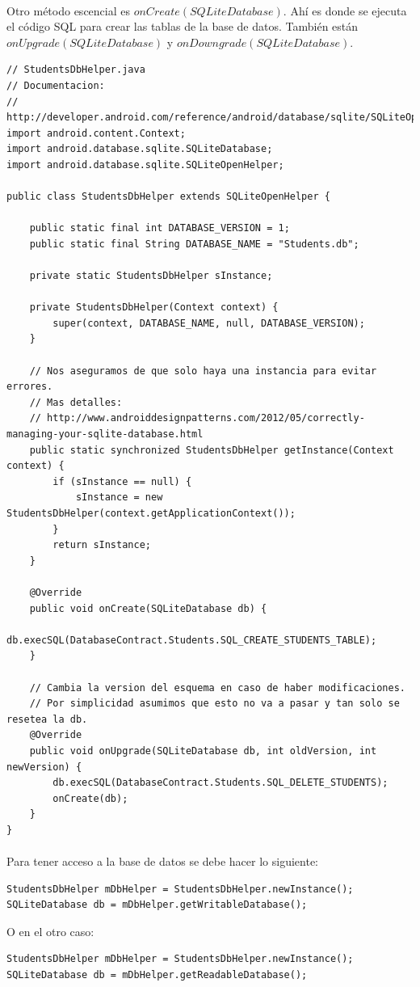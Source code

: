 \documentclass[10pt]{extarticle}
\begin{document}
\paragraph{}
Otro método escencial es $onCreate(SQLiteDatabase)$. Ahí es donde se ejecuta el código SQL para crear las tablas de la base de datos. También están $onUpgrade(SQLiteDatabase)$ y $onDowngrade(SQLiteDatabase)$.

\begin{lstlisting}
// StudentsDbHelper.java
// Documentacion:
// http://developer.android.com/reference/android/database/sqlite/SQLiteOpenHelper.html
import android.content.Context;
import android.database.sqlite.SQLiteDatabase;
import android.database.sqlite.SQLiteOpenHelper;

public class StudentsDbHelper extends SQLiteOpenHelper {

    public static final int DATABASE_VERSION = 1;
    public static final String DATABASE_NAME = "Students.db";

    private static StudentsDbHelper sInstance;

    private StudentsDbHelper(Context context) {
        super(context, DATABASE_NAME, null, DATABASE_VERSION);
    }
	
	// Nos aseguramos de que solo haya una instancia para evitar errores.
	// Mas detalles: 
	// http://www.androiddesignpatterns.com/2012/05/correctly-managing-your-sqlite-database.html
    public static synchronized StudentsDbHelper getInstance(Context context) {
        if (sInstance == null) {
            sInstance = new StudentsDbHelper(context.getApplicationContext());
        }
        return sInstance;
    }
	
    @Override
    public void onCreate(SQLiteDatabase db) {
        db.execSQL(DatabaseContract.Students.SQL_CREATE_STUDENTS_TABLE);
    }
	
	// Cambia la version del esquema en caso de haber modificaciones.
	// Por simplicidad asumimos que esto no va a pasar y tan solo se resetea la db.
    @Override
    public void onUpgrade(SQLiteDatabase db, int oldVersion, int newVersion) {
        db.execSQL(DatabaseContract.Students.SQL_DELETE_STUDENTS);
        onCreate(db);
    }
}
\end{lstlisting}

\paragraph{}
Para tener acceso a la base de datos se debe hacer lo siguiente:
\begin{lstlisting}
StudentsDbHelper mDbHelper = StudentsDbHelper.newInstance();
SQLiteDatabase db = mDbHelper.getWritableDatabase();
\end{lstlisting}
O en el otro caso:
\begin{lstlisting}
StudentsDbHelper mDbHelper = StudentsDbHelper.newInstance();
SQLiteDatabase db = mDbHelper.getReadableDatabase();
\end{lstlisting}
\end{document}
